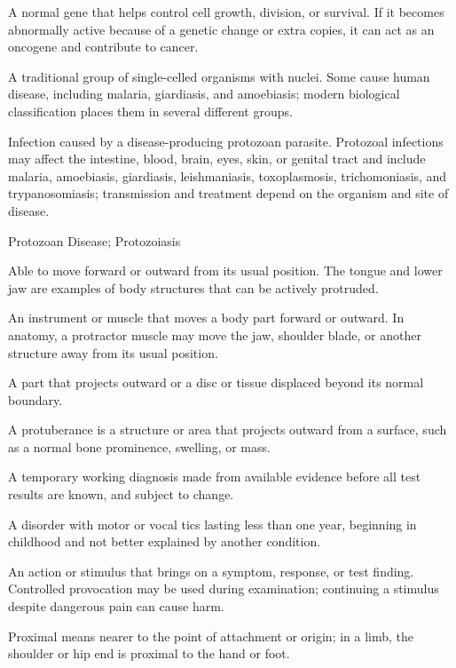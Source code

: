  A normal gene that helps control cell growth, division, or survival. If it becomes abnormally active because of a genetic change or extra copies, it can act as an oncogene and contribute to cancer.

 A traditional group of single-celled organisms with nuclei. Some cause human disease, including malaria, giardiasis, and amoebiasis; modern biological classification places them in several different groups.

 Infection caused by a disease-producing protozoan parasite. Protozoal infections may affect the intestine, blood, brain, eyes, skin, or genital tract and include malaria, amoebiasis, giardiasis, leishmaniasis, toxoplasmosis, trichomoniasis, and trypanosomiasis; transmission and treatment depend on the organism and site of disease.

\synonyms
Protozoan Disease; Protozoiasis

 Able to move forward or outward from its usual position. The tongue and lower jaw are examples of body structures that can be actively protruded.

 An instrument or muscle that moves a body part forward or outward. In anatomy, a protractor muscle may move the jaw, shoulder blade, or another structure away from its usual position.

 A part that projects outward or a disc or tissue displaced beyond its normal boundary.

 A protuberance is a structure or area that projects outward from a surface, such as a normal bone prominence, swelling, or mass.

 A temporary working diagnosis made from available evidence before all test results are known, and subject to change.

 A disorder with motor or vocal tics lasting less than one year, beginning in childhood and not better explained by another condition.

 An action or stimulus that brings on a symptom, response, or test finding. Controlled provocation may be used during examination; continuing a stimulus despite dangerous pain can cause harm.

 Proximal means nearer to the point of attachment or origin; in a limb, the shoulder or hip end is proximal to the hand or foot.

